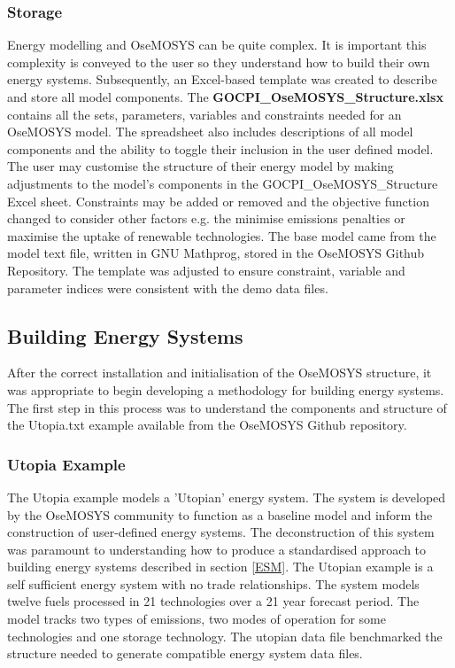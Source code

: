 \documentclass[12pt]{article}
\begin{document}
\subsubsection{Storage}\label{OSTORAGE}
Energy modelling and OseMOSYS can be quite complex. It is important this complexity is conveyed to the user so they understand how to build their own energy systems.
Subsequently, an Excel-based template was created to describe and store all model components. The \textbf{GOCPI\_OseMOSYS\_Structure.xlsx} contains
all the sets, parameters, variables and constraints needed for an OseMOSYS model. The spreadsheet also includes descriptions of all model components
and the ability to toggle their inclusion in the user defined model. 
The user may customise the structure of their energy model by making adjustments to the model's components in the GOCPI\_OseMOSYS\_Structure Excel sheet.
Constraints may be added or removed and the objective function changed to consider other factors e.g. the minimise emissions penalties or maximise the uptake of renewable technologies.
The base model came from the model text file, written in GNU Mathprog, stored in the OseMOSYS Github Repository.
The template was adjusted to ensure constraint, variable and parameter indices were consistent with the demo data files.

\subsection{Building Energy Systems}\label{BES}
After the correct installation and initialisation of the OseMOSYS structure, 
it was appropriate to begin developing a methodology for building energy systems.
The first step in this process was to understand the components and structure of the Utopia.txt example available from the OseMOSYS Github repository.
\subsubsection{Utopia Example}
The Utopia example models a 'Utopian' energy system.
The system is developed by the OseMOSYS community to function as a baseline model and inform the construction of user-defined energy systems.
The deconstruction of this system was paramount to understanding how to produce a standardised approach to building energy systems described in section \ref{ESM}.
The Utopian example is a self sufficient energy system with no trade relationships. 
The system models twelve fuels processed in 21 technologies over a 21 year forecast period.
The model tracks two types of emissions, two modes of operation for some technologies and one storage technology.
The utopian data file benchmarked the structure needed to generate compatible energy system data files. 
\end{document}
